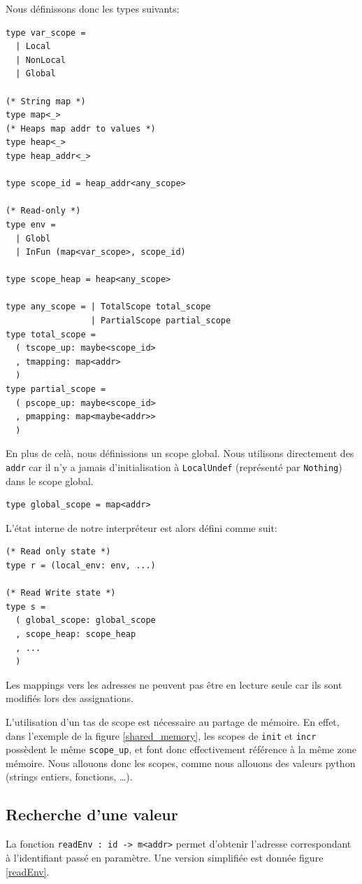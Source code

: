 \documentclass[a4paper, french, 11pt]{article}
\theoremstyle{break}
\begin{document}
Nous définissons donc les types suivants:
\begin{lstlisting}[style=myStyle, language=caml]
type var_scope =
  | Local
  | NonLocal
  | Global

(* String map *)
type map<_>
(* Heaps map addr to values *)
type heap<_>
type heap_addr<_>

type scope_id = heap_addr<any_scope>

(* Read-only *)
type env =
  | Globl
  | InFun (map<var_scope>, scope_id)

type scope_heap = heap<any_scope>

type any_scope = | TotalScope total_scope
                 | PartialScope partial_scope
type total_scope =
  ( tscope_up: maybe<scope_id>
  , tmapping: map<addr>
  )
type partial_scope =
  ( pscope_up: maybe<scope_id>
  , pmapping: map<maybe<addr>>
  )
\end{lstlisting}

En plus de celà, nous définissions un scope global. Nous utilisons directement des \texttt{addr} car il n'y a jamais d'initialisation à \texttt{LocalUndef} (représenté par \texttt{Nothing}) dans le scope global.
\begin{lstlisting}[style=myStyle, language=caml, firstnumber=17]
type global_scope = map<addr>
\end{lstlisting}

L'état interne de notre interpréteur est alors défini comme suit:
\begin{lstlisting}[style=myStyle, language=caml]
(* Read only state *)
type r = (local_env: env, ...)

(* Read Write state *)
type s =
  ( global_scope: global_scope
  , scope_heap: scope_heap
  , ...
  )
\end{lstlisting}

Les mappings vers les adresses ne peuvent pas être en lecture seule car ils sont modifiés lors des assignations.

L'utilisation d'un tas de scope est nécessaire au partage de mémoire.
En effet, dans l'exemple de la figure \vref{shared_memory}, les scopes de \texttt{init} et \texttt{incr} possèdent le même \texttt{scope\_up}, et font donc effectivement référence à la même zone mémoire.
Nous allouons donc les scopes, comme nous allouons des valeurs python (strings entiers, fonctions, \dots).

\subsection{Recherche d'une valeur}
La fonction \texttt{readEnv : id -> m<addr>} permet d'obtenir l'adresse correspondant à l'identifiant passé en paramètre.
Une version simplifiée est donnée figure \vref{readEnv}.
\end{document}
